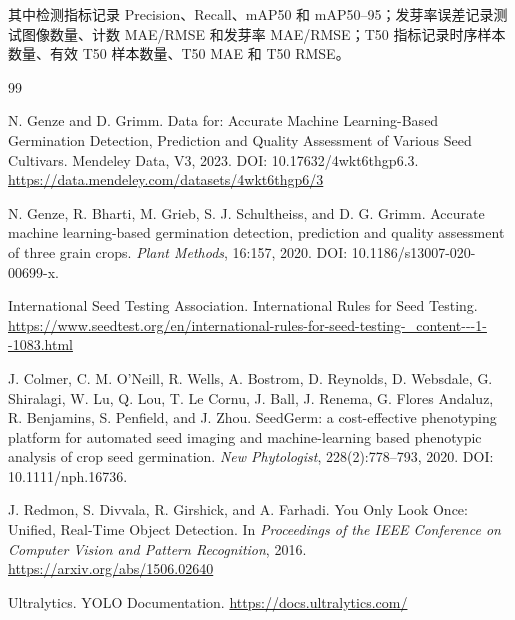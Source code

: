 \documentclass[UTF8,a4paper,zihao=-4]{ctexart}
\begin{document}
其中检测指标记录 Precision、Recall、mAP50 和 mAP50--95；发芽率误差记录测试图像数量、计数 MAE/RMSE 和发芽率 MAE/RMSE；T50 指标记录时序样本数量、有效 T50 样本数量、T50 MAE 和 T50 RMSE。

\begin{thebibliography}{99}

N. Genze and D. Grimm. Data for: Accurate Machine Learning-Based Germination Detection, Prediction and Quality Assessment of Various Seed Cultivars. Mendeley Data, V3, 2023. DOI: 10.17632/4wkt6thgp6.3. \url{https://data.mendeley.com/datasets/4wkt6thgp6/3}

N. Genze, R. Bharti, M. Grieb, S. J. Schultheiss, and D. G. Grimm. Accurate machine learning-based germination detection, prediction and quality assessment of three grain crops. \emph{Plant Methods}, 16:157, 2020. DOI: 10.1186/s13007-020-00699-x.

International Seed Testing Association. International Rules for Seed Testing. \url{https://www.seedtest.org/en/international-rules-for-seed-testing-_content---1--1083.html}

J. Colmer, C. M. O'Neill, R. Wells, A. Bostrom, D. Reynolds, D. Websdale, G. Shiralagi, W. Lu, Q. Lou, T. Le Cornu, J. Ball, J. Renema, G. Flores Andaluz, R. Benjamins, S. Penfield, and J. Zhou. SeedGerm: a cost-effective phenotyping platform for automated seed imaging and machine-learning based phenotypic analysis of crop seed germination. \emph{New Phytologist}, 228(2):778--793, 2020. DOI: 10.1111/nph.16736.

J. Redmon, S. Divvala, R. Girshick, and A. Farhadi. You Only Look Once: Unified, Real-Time Object Detection. In \emph{Proceedings of the IEEE Conference on Computer Vision and Pattern Recognition}, 2016. \url{https://arxiv.org/abs/1506.02640}

Ultralytics. YOLO Documentation. \url{https://docs.ultralytics.com/}

\end{thebibliography}
\end{document}
